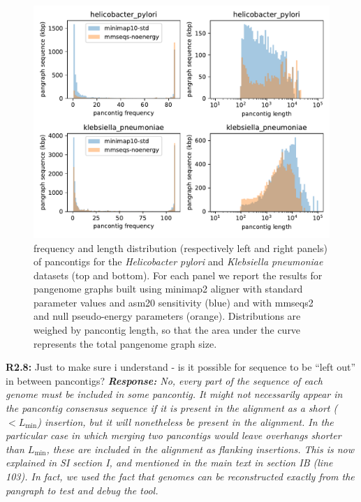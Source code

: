 \documentclass[aps,rmp,onecolumn]{revtex4-1}
\newcommand{\Lthr}{L_{\min}}
\newcommand{\Marco}[1]{{\color{orange}Marco: #1}}
\newcommand{\Liam}[1]{{\color{teal}Liam: #1}}
\newcommand{\reviewer}[2]{\textbf{#1:} #2\vskip 5mm}
\newcommand{\response}[1]{{\it {\color{response}\textbf{Response:} #1}}\vskip 5mm}
\begin{document}
\begin{figure}[htb]
      \includegraphics[width=.7\textwidth]{figs_response/hp_vs_kp.pdf}
      \caption{frequency and length distribution (respectively left and right panels) of pancontigs for the \textit{Helicobacter pylori} and \textit{Klebsiella pneumoniae} datasets (top and bottom). For each panel we report the results for pangenome graphs built using minimap2 aligner with standard parameter values and asm20 sensitivity (blue) and with mmseqs2 and null pseudo-energy parameters (orange). Distributions are weighed by pancontig length, so that the area under the curve represents the total pangenome graph size.}
      \label{fig:kp-vs-hp}
\end{figure}

\reviewer{R2.8}{Just to make sure i understand - is it possible for sequence to be ``left out'' in between pancontigs?}
\response{No, every part of the sequence of each genome must be included in some pancontig. It might not necessarily appear in the pancontig consensus sequence if it is present in the alignment as a short ($< \Lthr$) insertion, but it will nonetheless be present in the alignment. In the particular case in which merging two pancontigs would leave overhangs shorter than $\Lthr$, these are included in the alignment as flanking insertions. This is now explained in SI section I, and mentioned in the main text in section IB (line 103).
      In fact, we used the fact that genomes can be reconstructed exactly from the pangraph to test and debug the tool. }
\end{document}
